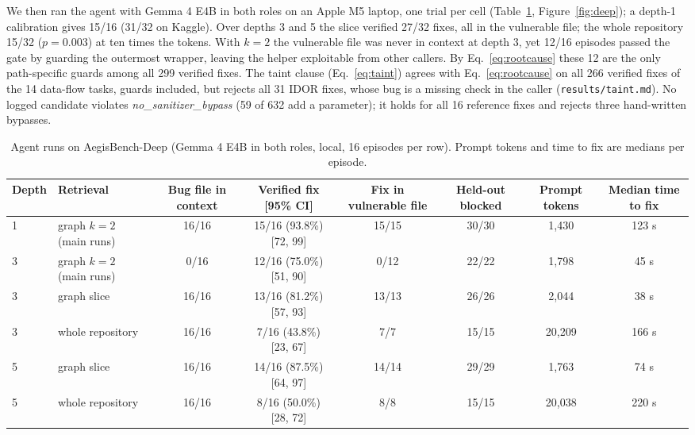 \documentclass[journal]{IEEEtran}
\newcommand{\code}[1]{\texttt{#1}}
\begin{document}
We then ran the agent with Gemma 4 E4B in both roles on an Apple M5 laptop, one trial per cell (Table~\ref{tab:deep}, Figure~\ref{fig:deep}); a depth-1 calibration gives 15/16 (31/32 on Kaggle). Over depths 3 and 5 the slice verified 27/32 fixes, all in the vulnerable file; the whole repository 15/32 ($p = 0.003$) at ten times the tokens. With $k = 2$ the vulnerable file was never in context at depth 3, yet 12/16 episodes passed the gate by guarding the outermost wrapper, leaving the helper exploitable from other callers. By Eq.~\ref{eq:rootcause} these 12 are the only path-specific guards among all 299 verified fixes. The taint clause (Eq.~\ref{eq:taint}) agrees with Eq.~\ref{eq:rootcause} on all 266 verified fixes of the 14 data-flow tasks, guards included, but rejects all 31 IDOR fixes, whose bug is a missing check in the caller (\code{results/taint.md}). No logged candidate violates \emph{no\_sanitizer\_bypass} (59 of 632 add a parameter); it holds for all 16 reference fixes and rejects three hand-written bypasses.

\begin{table}[!t]
\centering\small
\caption{Agent runs on AegisBench-Deep (Gemma 4 E4B in both roles, local, 16 episodes per row). Prompt tokens and time to fix are medians per episode.}
\label{tab:deep}
\begin{adjustbox}{max width=\linewidth}\begin{tabular}{llcccccc}
\toprule
Depth & Retrieval & Bug file in context & Verified fix [95\% CI] & Fix in vulnerable file & Held-out blocked & Prompt tokens & Median time to fix\\
\midrule
1 & graph $k{=}2$ (main runs) & 16/16 & 15/16 (93.8\%) [72, 99] & 15/15 & 30/30 & 1,430 & 123 s\\
3 & graph $k{=}2$ (main runs) & 0/16 & 12/16 (75.0\%) [51, 90] & 0/12 & 22/22 & 1,798 & 45 s\\
3 & graph slice & 16/16 & 13/16 (81.2\%) [57, 93] & 13/13 & 26/26 & 2,044 & 38 s\\
3 & whole repository & 16/16 & 7/16 (43.8\%) [23, 67] & 7/7 & 15/15 & 20,209 & 166 s\\
5 & graph slice & 16/16 & 14/16 (87.5\%) [64, 97] & 14/14 & 29/29 & 1,763 & 74 s\\
5 & whole repository & 16/16 & 8/16 (50.0\%) [28, 72] & 8/8 & 15/15 & 20,038 & 220 s\\
\bottomrule
\end{tabular}\end{adjustbox}
\end{table}
\end{document}
